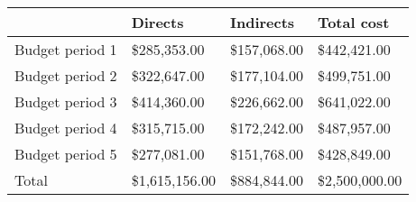 \begin{tabular}{llll}
\hline
{} &        Directs &    Indirects &     Total cost \\
\hline
Budget period 1 &    \$285,353.00 &  \$157,068.00 &    \$442,421.00 \\
Budget period 2 &    \$322,647.00 &  \$177,104.00 &    \$499,751.00 \\
Budget period 3 &    \$414,360.00 &  \$226,662.00 &    \$641,022.00 \\
Budget period 4 &    \$315,715.00 &  \$172,242.00 &    \$487,957.00 \\
Budget period 5 &    \$277,081.00 &  \$151,768.00 &    \$428,849.00 \\\hline
Total           &  \$1,615,156.00 &  \$884,844.00 &  \$2,500,000.00 \\
\hline
\end{tabular}
